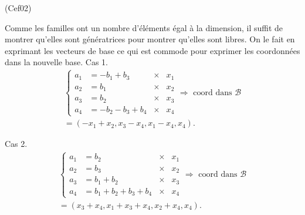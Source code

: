 \begin{tiny}(Cef02)\end{tiny} Comme les familles ont un nombre d'éléments égal à la dimension, il suffit de montrer qu'elles sont génératrices pour montrer qu'elles sont libres. On le fait en exprimant les vecteurs de base ce qui est commode pour exprimer les coordonnées dans la nouvelle base.\newline
Cas 1.
\begin{multline*}
  \left\lbrace
  \begin{aligned}
    a_1 &= -b_1 + b_3 &\times& x_1\\
    a_2 &= b_1  &\times& x_2\\
    a_3 &= b_2 &\times& x_3\\
    a_4 &= -b_2 - b_3 + b_4 &\times& x_4
  \end{aligned}
\right.
\Rightarrow \text{ coord dans } \mathcal{B}\\
= (-x_1 + x_2, x_3 - x_4, x_1 - x_4, x_4).
\end{multline*}

Cas 2.
\begin{multline*}
  \left\lbrace
  \begin{aligned}
    a_1 &= b_2 &\times& x_1\\
    a_2 &= b_3  &\times& x_2\\
    a_3 &= b_1 + b_2 &\times& x_3\\
    a_4 &= b_1 + b_2 + b_3 + b_4 &\times& x_4
  \end{aligned}
\right.
\Rightarrow \text{ coord dans } \mathcal{B}\\
= (x_3 + x_4, x_1 + x_3 + x_4, x_2 + x_4, x_4).
\end{multline*}

